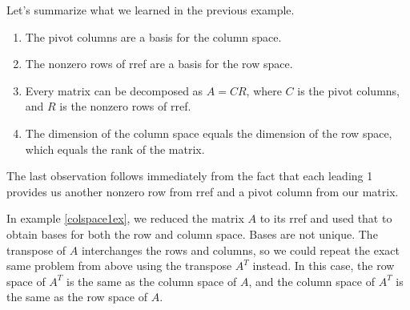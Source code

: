 Let's summarize what we learned in the previous example.
\begin{enumerate}
	\item The pivot columns are a basis for the column space. 
	\item The nonzero rows of rref are a basis for the row space.
	\item Every matrix can be decomposed as $A=CR$, where $C$ is the pivot columns, and $R$ is the nonzero rows of rref.
	\item The dimension of the column space equals the dimension of the row space, which equals the rank of the matrix.
\end{enumerate}
The last observation follows immediately from the fact that each leading 1 provides us another nonzero row from rref and a pivot column from our matrix.


In example \ref{colspace1ex}, we reduced the matrix $A$ to its rref and used that to obtain bases for both the row and column space. Bases are not unique. The transpose of $A$ interchanges the rows and columns, so we could repeat the exact same problem from above using the transpose $A^T$ instead. In this case, the row space of $A^T$ is the same as the column space of $A$, and the column space of $A^T$ is the same as the row space of $A$.



